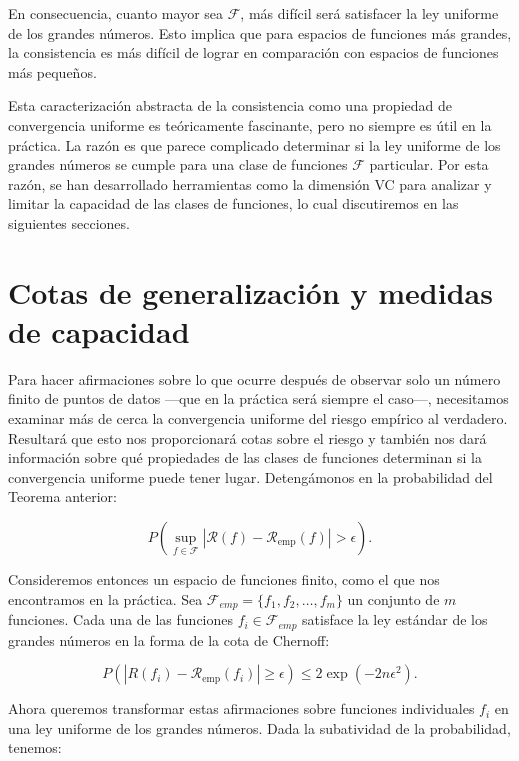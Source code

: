 \documentclass{article}
\begin{document}
En consecuencia, cuanto mayor sea \(\mathcal{F}\), más difícil será satisfacer la ley uniforme de los grandes números. 
Esto implica que para espacios de funciones más grandes, la consistencia es más difícil de lograr en comparación 
con espacios de funciones más pequeños.


Esta caracterización abstracta de la consistencia como una propiedad de convergencia uniforme es teóricamente 
fascinante, pero no siempre es útil en la práctica. La razón es que parece complicado determinar si la ley uniforme 
de los grandes números se cumple para una clase de funciones \(\mathcal{F}\) particular. Por esta razón, se han desarrollado 
herramientas como la dimensión VC para analizar y limitar la capacidad de las clases de funciones, lo cual discutiremos 
en las siguientes secciones.

\section{Cotas de generalización y medidas de capacidad}

Para hacer afirmaciones sobre lo que ocurre después de observar solo un número finito de puntos de datos 
—que en la práctica será siempre el caso—, necesitamos examinar más de cerca la 
convergencia uniforme del riesgo empírico al verdadero.
 Resultará que esto nos proporcionará cotas sobre el riesgo y también nos dará información sobre 
qué propiedades de las clases de funciones determinan si la convergencia uniforme puede tener lugar. Detengámonos
en la probabilidad del Teorema anterior:

\begin{equation}
P\left(\sup_{f \in \mathcal{F}} |\mathcal{R}(f) - \mathcal{R}_{\text{emp}}(f)| > \epsilon \right). \label{eq:med_unif_riesgo_riesgo_emp}
\end{equation}

Consideremos entonces un espacio de funciones finito, como el que nos encontramos en la práctica. Sea
\(\mathcal{F}_{emp} = \{f_1, f_2, \dots, f_m\}\) un conjunto de \(m\) funciones. Cada una de las funciones 
\(f_i \in \mathcal{F}_{emp}\) satisface la ley estándar de los grandes números en la forma de la cota de Chernoff:

\[
P\left(|R(f_i) - \mathcal{R}_{\text{emp}}(f_i)| \geq \epsilon \right) \leq 2 \exp(-2n\epsilon^2).
\]

Ahora queremos transformar estas afirmaciones sobre funciones individuales \(f_i\) en una ley uniforme de los 
grandes números. Dada la subatividad de la probabilidad, tenemos:
\end{document}
